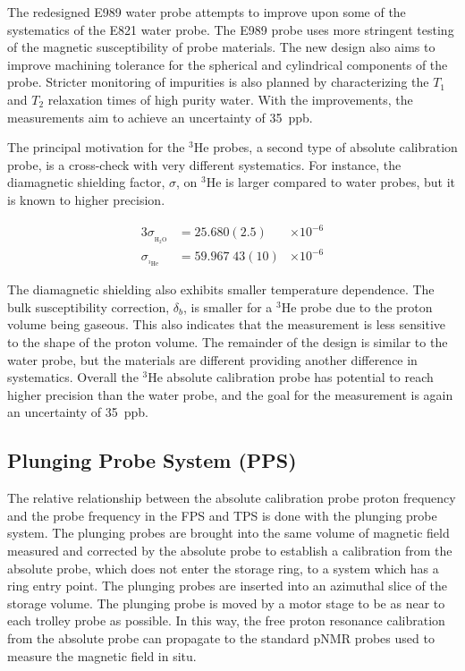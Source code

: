 The redesigned E989 water probe attempts to improve upon some of the systematics of the E821 water probe.  The E989 probe uses more stringent testing of the magnetic susceptibility of probe materials.  The new design also aims to improve machining tolerance for the spherical and cylindrical components of the probe. Stricter monitoring of impurities is also planned by characterizing the $T_1$ and $T_2$ relaxation times of high purity water.  With the improvements, the measurements aim to achieve an uncertainty of \SI{35}{ppb}. \cite{e989-tdr}

The principal motivation for the $\mathrm{^3He}$ probes, a second type of absolute calibration probe, is a cross-check with very different systematics.  For instance, the diamagnetic shielding factor, $\sigma$, on $\mathrm{^3He}$ is larger compared to water probes, but it is known to higher precision.

\begin{alignat}{3}
\sigma_{_{\mathrm{H_2 O}}} & = 25.680(2.5)  & \times 10^{-6} \\
\sigma_{_{\mathrm{^3He}}}  & = 59.967\;43(10) & \times 10^{-6} 
\end{alignat}

\noindent
The diamagnetic shielding also exhibits smaller temperature dependence.  The bulk susceptibility correction, $\delta_b$, is smaller for a $\mathrm{^3He}$ probe due to the proton volume being gaseous.  This also indicates that the measurement is less sensitive to the shape of the proton volume.  The remainder of the design is similar to the water probe, but the materials are different providing another difference in systematics.  Overall the $\mathrm{^3He}$ absolute calibration probe has potential to reach higher precision than the water probe, and the goal for the measurement is again an uncertainty of \SI{35}{ppb}. \cite{e989-tdr}

\subsection{Plunging Probe System (PPS)}

The relative relationship between the absolute calibration probe proton frequency and the probe frequency in the FPS and TPS is done with the plunging probe system.  The plunging probes are brought into the same volume of magnetic field measured and corrected by the absolute probe to establish a calibration from the absolute probe, which does not enter the storage ring, to a system which has a ring entry point.  The plunging probes are inserted into an azimuthal slice of the storage volume.  The plunging probe is moved by a motor stage to be as near to each trolley probe as possible.  In this way, the free proton resonance calibration from the absolute probe can propagate to the standard pNMR probes used to measure the \gmtwo magnetic field in situ.

